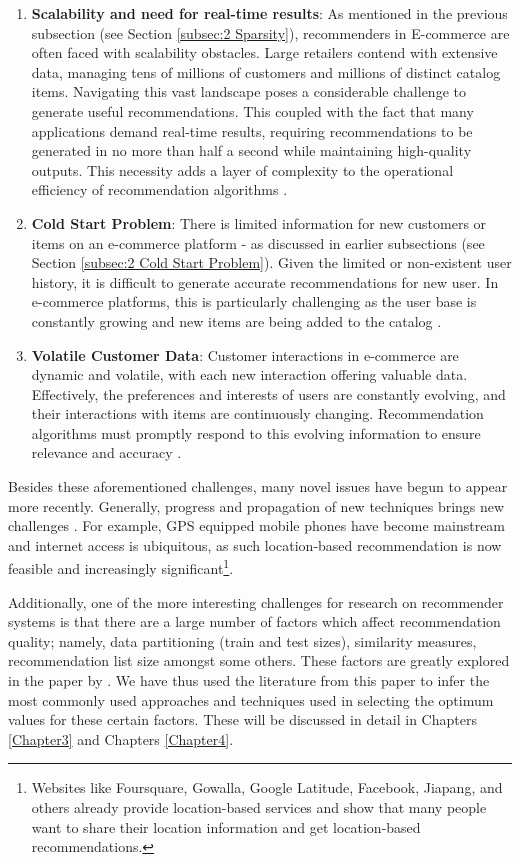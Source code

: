 \begin{enumerate}
    \item \textbf{Scalability and need for real-time results}: As mentioned in the previous subsection (see Section \ref{subsec:2 Sparsity}), recommenders in E-commerce are often faced with scalability obstacles. Large retailers contend with extensive data, managing tens of millions of customers and millions of distinct catalog items. Navigating this vast landscape poses a considerable challenge to generate useful recommendations. This coupled with the fact that many applications demand real-time results, requiring recommendations to be generated in no more than half a second while maintaining high-quality outputs. This necessity adds a layer of complexity to the operational efficiency of recommendation algorithms \cite{linden2003amazon}.
    \item \textbf{Cold Start Problem}: There is limited information for new customers or items on an e-commerce platform - as discussed in earlier subsections (see Section \ref{subsec:2 Cold Start Problem}). Given the limited or non-existent user history, it is difficult to generate accurate recommendations for new user. In e-commerce platforms, this is particularly challenging as the user base is constantly growing and new items are being added to the catalog \cite{linden2003amazon}.
    \item \textbf{Volatile Customer Data}: Customer interactions in e-commerce are dynamic and volatile, with each new interaction offering valuable data. Effectively, the preferences and interests of users are constantly evolving, and their interactions with items are continuously changing. Recommendation algorithms must promptly respond to this evolving information to ensure relevance and accuracy \cite{linden2003amazon}.
\end{enumerate}

Besides these aforementioned challenges, many novel issues have begun to appear more recently. Generally, progress and propagation of new techniques brings new challenges \cite{smith2017two}. For example, GPS equipped mobile phones have become mainstream and internet access is ubiquitous, as such location-based recommendation is now feasible and increasingly significant\footnote{Websites like Foursquare, Gowalla, Google Latitude, Facebook, Jiapang, and others already provide location-based services and show that many people want to share their location information and get location-based recommendations.}. 

Additionally, one of the more interesting challenges for research on recommender systems is that there are a large number of factors which affect recommendation quality; namely, data partitioning (train and test sizes), similarity measures, recommendation list size amongst some others. These factors are greatly explored in the paper by \cite{symeonidis2008collaborative}. We have thus used the literature from this paper to infer the most commonly used approaches and techniques used in selecting the optimum values for these certain factors. These will be discussed in detail in Chapters \ref{Chapter3} and Chapters \ref{Chapter4}.

